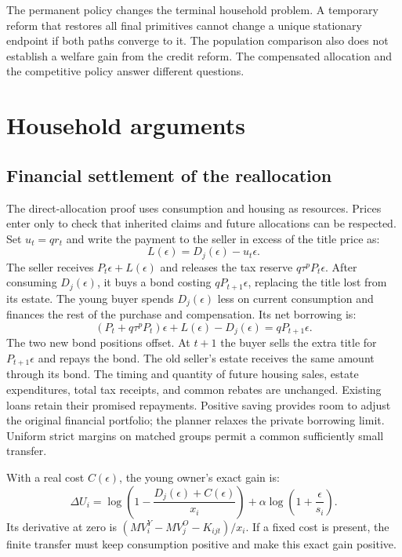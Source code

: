 \documentclass[11pt]{article}
\begin{document}
The permanent policy changes the terminal household problem. A temporary
reform that restores all final primitives cannot change a unique stationary
endpoint if both paths converge to it. The population comparison also does
not establish a welfare gain from the credit reform. The compensated
allocation and the competitive policy answer different questions.

\clearpage
\appendix
\section{Household arguments}
\label{app:amend_households}

\subsection{Financial settlement of the reallocation}
\label{app:amend_settlement}

The direct-allocation proof uses consumption and housing as resources.
Prices enter only to check that inherited claims and future allocations can
be respected. Set $u_t=q r_t$ and write the payment to the seller in excess
of the title price as:
\begin{equation}
 L(\epsilon)=D_j(\epsilon)-u_t\epsilon.
 \label{eq:amend_compensation}
\end{equation}
The seller receives $P_t\epsilon+L(\epsilon)$ and releases the tax reserve
$q\tau^pP_t\epsilon$. After consuming $D_j(\epsilon)$, it buys a bond
costing $qP_{t+1}\epsilon$, replacing the title lost from its estate.
The young buyer spends $D_j(\epsilon)$ less on current consumption and
finances the rest of the purchase and compensation. Its net borrowing is:
\begin{equation}
 (P_t+q\tau^pP_t)\epsilon+L(\epsilon)-D_j(\epsilon)
 =qP_{t+1}\epsilon.
 \label{eq:amend_settlement}
\end{equation}
The two new bond positions offset. At $t+1$ the buyer sells the extra title
for $P_{t+1}\epsilon$ and repays the bond. The old seller's estate receives
the same amount through its bond. The timing and quantity of future housing
sales, estate expenditures, total tax receipts, and common rebates are unchanged.
Existing loans retain their promised repayments. Positive saving provides
room to adjust the original financial portfolio; the planner relaxes the
private borrowing limit. Uniform strict margins on matched groups permit
a common sufficiently small transfer.

With a real cost $C(\epsilon)$, the young owner's exact gain is:
\begin{equation}
 \Delta U_i=
 \log\!\left(1-\frac{D_j(\epsilon)+C(\epsilon)}{x_i}\right)
 +\alpha\log\!\left(1+\frac{\epsilon}{s_i}\right).
 \label{eq:amend_exact_gain}
\end{equation}
Its derivative at zero is $(MV_i^Y-MV_j^O-K_{ijt})/x_i$.
If a fixed cost is present, the finite transfer must keep consumption
positive and make this exact gain positive.
\end{document}
